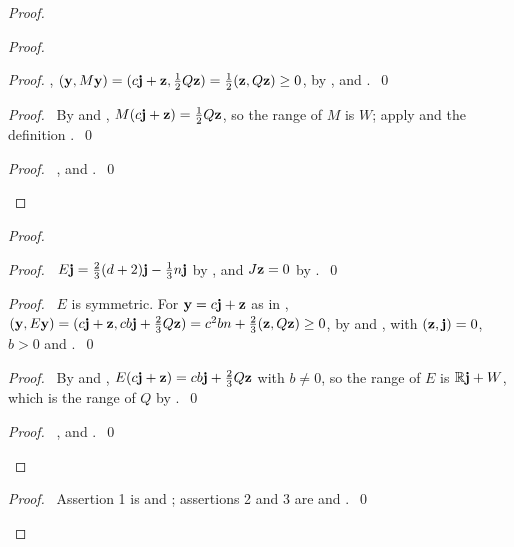 \begin{proof}
\begin{proof}
\begin{proof}
   , $({\mathbf y},M{\mathbf y})=(c{\mathbf j}+{\mathbf z},\frac12Q{\mathbf z})=\frac12({\mathbf z},Q{\mathbf z})\ge0$, by
   ,  and .~\qed\end{proof}
  \begin{proof}\pf\ By  and , $M(c{\mathbf j}+{\mathbf z})=\frac12Q{\mathbf z}$, so
   the range of $M$ is $W$; apply  and the definition
   .~\qed\end{proof}
  \qedstep
  \begin{proof}\pf\ ,  and .~\qed\end{proof}
 \end{proof}
 \begin{proof}
  \begin{proof}\pf\ $E{\mathbf j}=\frac23(d+2){\mathbf j}-\frac13n{\mathbf j}$ by , and $J{\mathbf z}=0$ by
   .~\qed\end{proof}
  \begin{proof}\pf\ $E$ is symmetric. For ${\mathbf y}=c{\mathbf j}+{\mathbf z}$ as in ,
   $({\mathbf y},E{\mathbf y})=(c{\mathbf j}+{\mathbf z},cb{\mathbf j}+\frac23Q{\mathbf z})=c^2bn+\frac23({\mathbf z},Q{\mathbf z})\ge0$, by 
   and , with $({\mathbf z},{\mathbf j})=0$, $b>0$ and .~\qed\end{proof}
  \begin{proof}\pf\ By  and , $E(c{\mathbf j}+{\mathbf z})=cb{\mathbf j}+\frac23Q{\mathbf z}$
   with $b\ne0$, so the range of $E$ is ${\mathbb R}{\mathbf j}+W$, which is the range of $Q$ by
   .~\qed\end{proof}
  \qedstep
  \begin{proof}\pf\ ,  and .~\qed\end{proof}
 \end{proof}
 \qedstep
 \begin{proof}\pf\ Assertion 1 is  and ; assertions 2 and 3 are
   and .~\qed\end{proof}
\end{proof}

